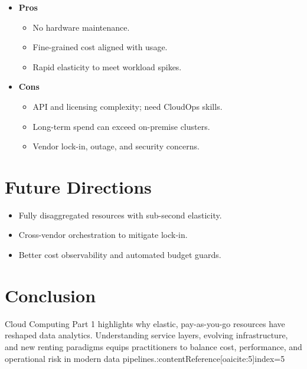 \documentclass[11pt]{article}
\begin{document}
\begin{itemize}[itemsep=0pt]
  \item \textbf{Pros}
    \begin{itemize}[itemsep=0pt]
      \item No hardware maintenance.
      \item Fine-grained cost aligned with usage.
      \item Rapid elasticity to meet workload spikes.
    \end{itemize}
  \item \textbf{Cons}
    \begin{itemize}[itemsep=0pt]
      \item API and licensing complexity; need CloudOps skills.
      \item Long-term spend can exceed on-premise clusters.
      \item Vendor lock-in, outage, and security concerns.
    \end{itemize}
\end{itemize}

\section{Future Directions}

\begin{itemize}[itemsep=0pt]
  \item Fully disaggregated resources with sub-second elasticity.
  \item Cross-vendor orchestration to mitigate lock-in.
  \item Better cost observability and automated budget guards.
\end{itemize}

\section*{Conclusion}

Cloud Computing Part 1 highlights why elastic, pay-as-you-go resources have reshaped data analytics.  
Understanding service layers, evolving infrastructure, and new renting paradigms equips practitioners to balance cost, performance, and operational risk in modern data pipelines.:contentReference[oaicite:5]{index=5}
\end{document}
